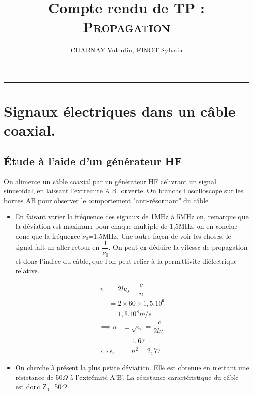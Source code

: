 \documentclass[12pt,a4paper]{article}
\author{CHARNAY Valentin, FINOT Sylvain}
\title{Compte rendu de TP :\\ \scshape Propagation}
\begin{document}
	\maketitle
	\rule{\linewidth}{0.4pt}
	\section{Signaux électriques  dans  un  câble  coaxial.}
	\subsection{Étude à l'aide d'un générateur HF}
	On alimente un câble coaxial par un générateur HF délivrant un signal sinusoïdal, en laissant l'extrémité A'B' ouverte. On branche l'oscilloscope sur les bornes AB pour observer le comportement "anti-résonnant" du câble
	\begin{itemize}[label=$\circ$]
		\item En faisant varier la fréquence des signaux de 1MHz à 5MHz on, remarque que la déviation est maximum pour chaque multiple de 1,5MHz, on en conclue donc que la fréquence $\nu_0$=1,5MHz. Une autre façon de voir les choses, le signal fait un aller-retour en $\dfrac{1}{\nu_0}$. On peut en déduire la vitesse de propagation et donc l'indice du câble, que l'on peut relier à la permittivité diélectrique relative.
		\begin{multicols}{2}
			\begin{align*}
			v&=2l\nu_0=\dfrac{c}{n}\\
			&=2\times60\times1,5.10^6\\
			&=1,8.10^8 m/s
			\end{align*}
			\vfill
			\setlength\columnseprule{0.5pt}
			\columnbreak
			\begin{align*}
			\implies n&\equiv\sqrt{\epsilon_r}=\dfrac{c}{2l\nu_0}\\
			&=1,67\\
			\iff \epsilon_r&=n^2=2,77
			\end{align*}
		\end{multicols}
		\item On cherche à présent la plus petite déviation. Elle est obtenue en mettant une résistance de 50$\Omega$ à l'extrémité A'B'. La résistance caractéristique du câble est donc Z$_0$=50$\Omega$ 
	\end{itemize}
\end{document}
